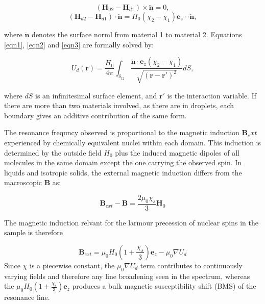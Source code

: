 \begin{equation} \label{eqn2}
  (\mathbf{H}_{d2} - \mathbf{H}_{d1}) \times \breve{\mathbf{n}} = 0,
\end{equation}
\begin{equation} \label{eqn3}
    (\mathbf{H}_{d2} - \mathbf{H}_{d1}) \cdot \breve{\mathbf{n}} = H_{0}(\chi_{2} -
    \chi_{1})\mathbf{e}_{z}\cdot\cdot\breve{\mathbf{n}},
\end{equation}

where $\breve{\mathbf{n}}$ denotes the surface norml from material 1 to material 2. Equations \ref{eqn1}, \ref{eqn2} and \ref{eqn3} are formally solved by:

\begin{equation}
  U_{d}(\mathbf{r}) = \frac{H_{0}}{4\pi}\int_{\delta_{12}}\frac{\breve{\mathbf{n}}\cdot\mathbf{e}_{z}(\chi_{2}-\chi_{1})}{\sqrt{(\mathbf{r}-\mathbf{r'})^{2}}}dS,
\end{equation}

where $dS$ is an infinitesimal surface element, and $\mathbf{r'}$ is the interaction variable. If there are more than two materials involved, as there are in droplets, each boundary gives an additive contribution of the same form.

The resonance frequncy observed is proportional to the magnetic induction $\mathbf{B}_ext$
experienced by chemically equivalent nuclei within each domain. This induction is determined
by the outside field $H_{0}$ plus the induced magnetic dipoles of all molecules in the same domain except the one carrying the observed spin.\citep{Levitt:1996tg} In liquids and isotropic solids, the external magnetic induction differs from the macroscopic $\mathbf{B}$ as:

\begin{equation}
  \mathbf{B}_{ext}-\mathbf{B} = \frac{2\mu_{0}\chi_{s}}{3}\mathbf{H}_{0}
\end{equation}

The magnetic induction relvant for the larmour precession of nuclear spins in the sample is therefore

\begin{equation}
  \mathbf{B}_{ext} = \mu_{0}H_{0}(1 + \frac{\chi_{s}}{3})\mathbf{e}_{z} - \mu_{0} \nabla U_{d}
\end{equation}
Since $\chi$ is a piecewise constant, the $\mu_{0} \nabla U_{d}$ term contributes to continuously varying fields
and therefore any line broadening seen in the spectrum, whereas the $\mu_{0}H_{0}(1 + \frac{\chi_{s}}{3})\mathbf{e}_{z}$
produces a bulk magnetic susceptibility shift (BMS) of the resonance line.


